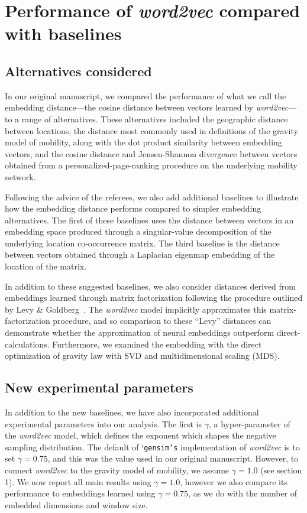\documentclass[12pt,a4paper]{article}
\begin{document}
%
%
\section{Performance of \textit{word2vec} compared with baselines}
\subsection{Alternatives considered}
In our original manuscript, we compared the performance of what we call the embedding distance---the cosine distance between vectors learned by \textit{word2vec}---to a range of alternatives.
These alternatives included the geographic distance between locations, the distance most commonly used in definitions of the gravity model of mobility, along with the dot product similarity between embedding vectors, and the cosine distance and Jensen-Shannon divergence between vectors obtained from a personalized-page-ranking procedure on the underlying mobility network.

Following the advice of the referees, we also add additional baselines to illustrate how the embedding distance performs compared to simpler embedding alternatives.
The first of these baselines uses the distance between vectors in an embedding space produced through a singular-value decomposition of the underlying location co-occurrence matrix.
The third baseline is the distance between vectors obtained through a Laplacian eigenmap embedding of the location of the matrix.

In addition to these suggested baselines, we also consider distances derived from embeddings learned through matrix factorization following the procedure outlined by Levy \& Goldberg~\autocite{levy2014neural}.
The \textit{word2vec} model  implicitly approximates this matrix-factorization procedure, and so comparison to these ``Levy'' distances can demonstrate whether the approximation of neural embeddings outperform direct-calculations. Furthermore, we examined the embedding with the direct optimization of gravity law with SVD and multidimensional scaling (MDS).


\subsection{New experimental parameters}
In addition to the new baselines, we have also incorporated additional experimental parameters into our analysis.
The first is $\gamma$, a hyper-parameter of the \textit{word2vec} model, which defines the exponent which shapes the negative sampling distribution.
The default of `\texttt{gensim's} implementation of \textit{word2vec} is to set $\gamma = 0.75$, and this was the value used in our original manuscript.
However, to connect \textit{word2vec} to the gravity model of mobility, we assume $\gamma = 1.0$ (see section 1).
We now report all main results using $\gamma = 1.0$, however we also compare its performance to embeddings learned using $\gamma = 0.75$, as we do with the number of embedded dimensions and window size.
\end{document}
